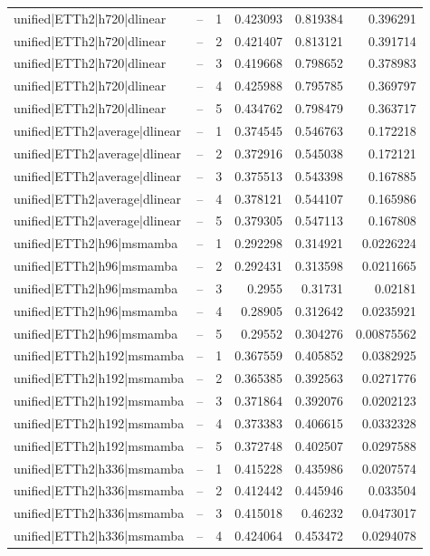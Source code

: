 \begin{longtable}{llrrrr}
unified|ETTh2|h720|dlinear & -- & 1 & 0.423093 & 0.819384 & 0.396291 \\
unified|ETTh2|h720|dlinear & -- & 2 & 0.421407 & 0.813121 & 0.391714 \\
unified|ETTh2|h720|dlinear & -- & 3 & 0.419668 & 0.798652 & 0.378983 \\
unified|ETTh2|h720|dlinear & -- & 4 & 0.425988 & 0.795785 & 0.369797 \\
unified|ETTh2|h720|dlinear & -- & 5 & 0.434762 & 0.798479 & 0.363717 \\
unified|ETTh2|average|dlinear & -- & 1 & 0.374545 & 0.546763 & 0.172218 \\
unified|ETTh2|average|dlinear & -- & 2 & 0.372916 & 0.545038 & 0.172121 \\
unified|ETTh2|average|dlinear & -- & 3 & 0.375513 & 0.543398 & 0.167885 \\
unified|ETTh2|average|dlinear & -- & 4 & 0.378121 & 0.544107 & 0.165986 \\
unified|ETTh2|average|dlinear & -- & 5 & 0.379305 & 0.547113 & 0.167808 \\
unified|ETTh2|h96|msmamba & -- & 1 & 0.292298 & 0.314921 & 0.0226224 \\
unified|ETTh2|h96|msmamba & -- & 2 & 0.292431 & 0.313598 & 0.0211665 \\
unified|ETTh2|h96|msmamba & -- & 3 & 0.2955 & 0.31731 & 0.02181 \\
unified|ETTh2|h96|msmamba & -- & 4 & 0.28905 & 0.312642 & 0.0235921 \\
unified|ETTh2|h96|msmamba & -- & 5 & 0.29552 & 0.304276 & 0.00875562 \\
unified|ETTh2|h192|msmamba & -- & 1 & 0.367559 & 0.405852 & 0.0382925 \\
unified|ETTh2|h192|msmamba & -- & 2 & 0.365385 & 0.392563 & 0.0271776 \\
unified|ETTh2|h192|msmamba & -- & 3 & 0.371864 & 0.392076 & 0.0202123 \\
unified|ETTh2|h192|msmamba & -- & 4 & 0.373383 & 0.406615 & 0.0332328 \\
unified|ETTh2|h192|msmamba & -- & 5 & 0.372748 & 0.402507 & 0.0297588 \\
unified|ETTh2|h336|msmamba & -- & 1 & 0.415228 & 0.435986 & 0.0207574 \\
unified|ETTh2|h336|msmamba & -- & 2 & 0.412442 & 0.445946 & 0.033504 \\
unified|ETTh2|h336|msmamba & -- & 3 & 0.415018 & 0.46232 & 0.0473017 \\
unified|ETTh2|h336|msmamba & -- & 4 & 0.424064 & 0.453472 & 0.0294078 \\

\end{longtable}
